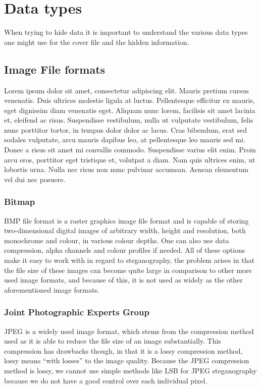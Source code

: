 \section{Data types}
When trying to hide data it is important to understand the various data types one might use for the cover file and the hidden information.

\subsection{Image File formats}
Lorem ipsum dolor sit amet, consectetur adipiscing elit. Mauris pretium cursus venenatis. Duis ultrices molestie ligula at luctus. Pellentesque efficitur ex mauris, eget dignissim diam venenatis eget. Aliquam nunc lorem, facilisis sit amet lacinia et, eleifend ac risus. Suspendisse vestibulum, nulla ut vulputate vestibulum, felis nunc porttitor tortor, in tempus dolor dolor ac lacus. Cras bibendum, erat sed sodales vulputate, arcu mauris dapibus leo, at pellentesque leo mauris sed mi. Donec a risus sit amet mi convallis commodo. Suspendisse varius elit enim. Proin arcu eros, porttitor eget tristique et, volutpat a diam. Nam quis ultrices enim, ut lobortis urna. Nulla nec risus non nunc pulvinar accumsan. Aenean elementum vel dui nec posuere.


\subsubsection*{Bitmap}
BMP file format is a raster graphics image file format and is capable of storing two-dimensional digital images of arbitrary width, height and resolution, both monochrome and colour, in various colour depths. 
One can also use data compression, alpha channels and colour profiles if needed.
All of these options make it easy to work with in regard to steganography, the problem arises in that the file size of these images can become quite large in comparison to other more used image formats, and because of this, it is not used as widely as the other aforementioned image formats.

\subsubsection*{Joint Photographic Experts Group}
JPEG is a widely used image format, which stems from the compression method used as it is able to reduce the file size of an image substantially.
This compression has drawbacks though, in that it is a lossy compression method, lossy means ``with losses'' to the image quality.
Because the JPEG compression method is lossy, we cannot use simple methods like LSB for JPEG steganography because we do not have a good control over each individual pixel.


